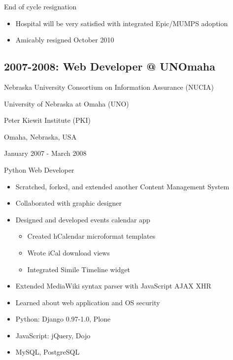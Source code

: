 \documentclass[letter,,openany,oneside]{sphinxhowto}
\begin{document}
End of cycle resignation
\begin{itemize}
\item {} 
Hospital will be very satisfied with integrated Epic/MUMPS adoption

\item {} 
Amicably resigned October 2010

\end{itemize}


\subsection{2007-2008: Web Developer @ UNOmaha}
\label{resume:web-developer-unomaha}
\begin{DUlineblock}{0em}
\item[] Nebraska University Consortium on Information Assurance (NUCIA)
\item[] University of Nebraska at Omaha (UNO)
\item[] Peter Kiewit Institute (PKI)
\item[] Omaha, Nebraska, USA
\item[] January 2007 - March 2008
\end{DUlineblock}

Python Web Developer
\begin{itemize}
\item {} 
Scratched, forked, and extended another Content Management System

\item {} 
Collaborated with graphic designer

\item {} 
Designed and developed events calendar app
\begin{itemize}
\item {} 
Created hCalendar microformat templates

\item {} 
Wrote iCal download views

\item {} 
Integrated Simile Timeline widget

\end{itemize}

\item {} 
Extended MediaWiki syntax parser with JavaScript AJAX XHR

\item {} 
Learned about web application and OS security

\item {} 
Python: Django 0.97-1.0, Plone

\item {} 
JavaScript: jQuery, Dojo

\item {} 
MySQL, PostgreSQL

\end{itemize}
\end{document}
